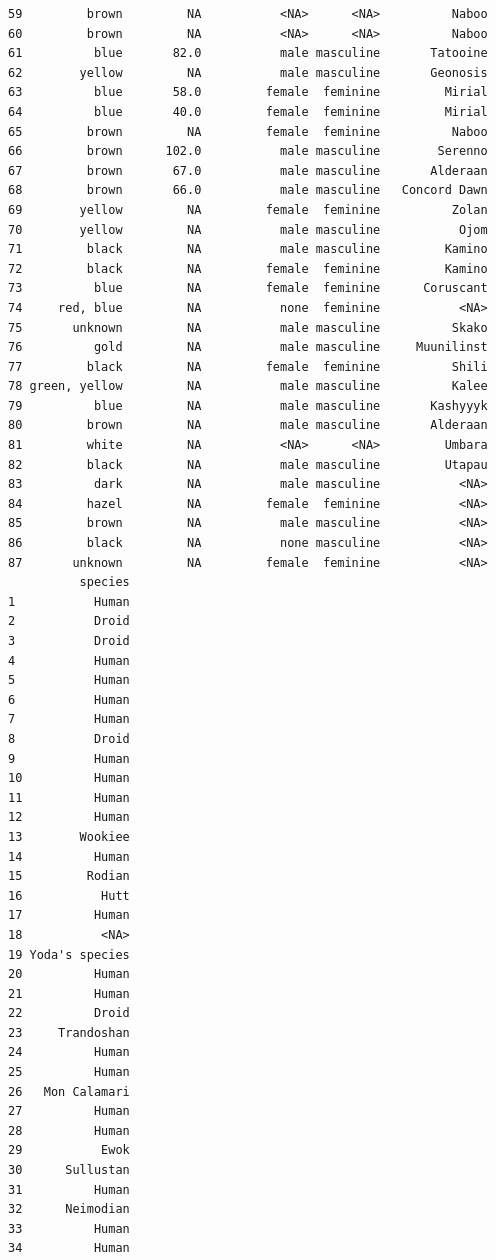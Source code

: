 \documentclass[
]{article}
\begin{document}
\begin{verbatim}
59         brown         NA           <NA>      <NA>          Naboo
60         brown         NA           <NA>      <NA>          Naboo
61          blue       82.0           male masculine       Tatooine
62        yellow         NA           male masculine       Geonosis
63          blue       58.0         female  feminine         Mirial
64          blue       40.0         female  feminine         Mirial
65         brown         NA         female  feminine          Naboo
66         brown      102.0           male masculine        Serenno
67         brown       67.0           male masculine       Alderaan
68         brown       66.0           male masculine   Concord Dawn
69        yellow         NA         female  feminine          Zolan
70        yellow         NA           male masculine           Ojom
71         black         NA           male masculine         Kamino
72         black         NA         female  feminine         Kamino
73          blue         NA         female  feminine      Coruscant
74     red, blue         NA           none  feminine           <NA>
75       unknown         NA           male masculine          Skako
76          gold         NA           male masculine     Muunilinst
77         black         NA         female  feminine          Shili
78 green, yellow         NA           male masculine          Kalee
79          blue         NA           male masculine       Kashyyyk
80         brown         NA           male masculine       Alderaan
81         white         NA           <NA>      <NA>         Umbara
82         black         NA           male masculine         Utapau
83          dark         NA           male masculine           <NA>
84         hazel         NA         female  feminine           <NA>
85         brown         NA           male masculine           <NA>
86         black         NA           none masculine           <NA>
87       unknown         NA         female  feminine           <NA>
          species
1           Human
2           Droid
3           Droid
4           Human
5           Human
6           Human
7           Human
8           Droid
9           Human
10          Human
11          Human
12          Human
13        Wookiee
14          Human
15         Rodian
16           Hutt
17          Human
18           <NA>
19 Yoda's species
20          Human
21          Human
22          Droid
23     Trandoshan
24          Human
25          Human
26   Mon Calamari
27          Human
28          Human
29           Ewok
30      Sullustan
31          Human
32      Neimodian
33          Human
34          Human

\end{verbatim}
\end{document}
